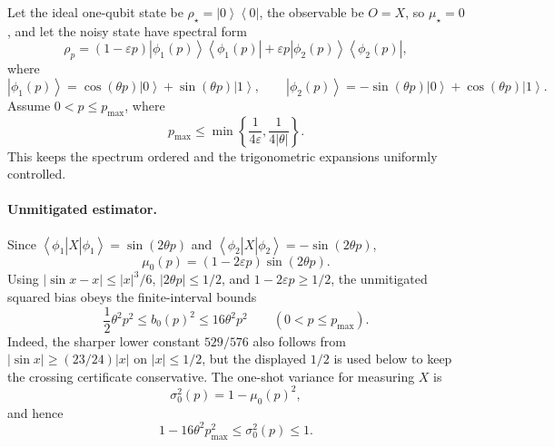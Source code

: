 \documentclass[11pt]{article}
\newcommand{\1}{\mathbf{1}}
\newcommand{\abs}[1]{\left\lvert #1 \right\rvert}
\newcommand{\bra}[1]{\left\langle #1\right|}
\newcommand{\ket}[1]{\left|#1\right\rangle}
\begin{document}
Let the ideal one-qubit state be \(\rho_\star=\ket0\bra0\), the observable be \(O=X\), so \(\mu_\star=0\), and let the noisy state have spectral form
\begin{equation}
    \rho_p=(1-\varepsilon p)\ket{\phi_1(p)}\bra{\phi_1(p)}+
    \varepsilon p\ket{\phi_2(p)}\bra{\phi_2(p)},
    \label{eq:toy_state_v4}
\end{equation}
where
\begin{equation}
    \ket{\phi_1(p)}=\cos(\theta p)\ket0+\sin(\theta p)\ket1,
    \qquad
    \ket{\phi_2(p)}=-\sin(\theta p)\ket0+\cos(\theta p)\ket1.
\end{equation}
Assume \(0<p\leq p_{\max}\), where
\begin{equation}
    p_{\max}\leq \min\left\{\frac{1}{4\varepsilon},\frac{1}{4\abs\theta}\right\}.
    \label{eq:pmax_toy_v4}
\end{equation}
This keeps the spectrum ordered and the trigonometric expansions uniformly controlled.

\paragraph{Unmitigated estimator.}
Since \(\bra{\phi_1}X\ket{\phi_1}=\sin(2\theta p)\) and \(\bra{\phi_2}X\ket{\phi_2}=-\sin(2\theta p)\),
\begin{equation}
    \mu_0(p)=(1-2\varepsilon p)\sin(2\theta p).
\end{equation}
Using \(\abs{\sin x-x}\leq \abs{x}^3/6\), \(\abs{2\theta p}\le1/2\), and \(1-2\varepsilon p\ge1/2\), the unmitigated squared bias obeys the finite-interval bounds
\begin{equation}
    \frac12\theta^2p^2
    \leq
    b_0(p)^2
    \leq
    16\theta^2p^2
    \qquad (0<p\leq p_{\max}).
    \label{eq:toy_b0_bounds_v4}
\end{equation}
Indeed, the sharper lower constant \(529/576\) also follows from \(\abs{\sin x}\ge(23/24)\abs{x}\) on \(\abs{x}\le1/2\), but the displayed \(1/2\) is used below to keep the crossing certificate conservative.
The one-shot variance for measuring \(X\) is
\begin{equation}
    \sigma_0^2(p)=1-\mu_0(p)^2,
\end{equation}
and hence
\begin{equation}
    1-16\theta^2p_{\max}^2\leq \sigma_0^2(p)\leq1.
    \label{eq:toy_s0_bounds_v4}
\end{equation}
\end{document}
